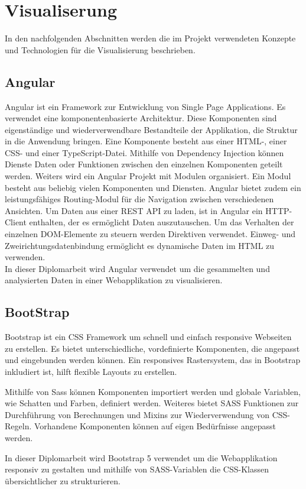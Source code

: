 \documentclass{report}
\begin{document}
\section{Visualiserung}
 In den nachfolgenden Abschnitten werden die im Projekt verwendeten Konzepte und Technologien  für die Visualisierung beschrieben.
\subsection{Angular}
Angular ist ein Framework zur Entwicklung von Single Page Applications. Es verwendet eine komponentenbasierte Architektur. Diese Komponenten sind eigenständige und wiederverwendbare Bestandteile  der Applikation, die Struktur in die Anwendung bringen. Eine Komponente besteht aus einer HTML-, einer CSS- und einer TypeScript-Datei. Mithilfe von Dependency Injection können Dienste Daten oder Funktionen  zwischen den einzelnen Komponenten geteilt werden. Weiters wird ein Angular Projekt mit Modulen organisiert. Ein Modul besteht aus beliebig vielen Komponenten und Diensten. Angular bietet zudem ein leistungsfähiges Routing-Modul für die Navigation zwischen verschiedenen Ansichten. Um Daten aus einer REST API zu laden, ist in Angular ein HTTP-Client enthalten, der es ermöglicht Daten auszutauschen. Um das Verhalten der einzelnen DOM-Elemente zu steuern werden Direktiven verwendet.
Einweg- und Zweirichtungsdatenbindung ermöglicht es dynamische Daten im HTML zu verwenden.
\\In dieser Diplomarbeit wird Angular verwendet um die gesammelten und analysierten Daten in einer Webapplikation zu visualisieren.

\subsection{BootStrap}
Bootstrap ist ein CSS Framework um schnell und einfach responsive Webseiten zu erstellen. Es bietet unterschiedliche, vordefinierte Komponenten, die angepasst und eingebunden werden können. Ein responsives Rastersystem, das in Bootstrap inkludiert ist, hilft flexible Layouts zu erstellen. 

Mithilfe von Sass können Komponenten importiert werden und globale Variablen, wie Schatten und Farben, definiert werden. Weiteres bietet SASS Funktionen zur Durchführung von Berechnungen und Mixins zur Wiederverwendung von CSS-Regeln. Vorhandene Komponenten können auf eigen Bedürfnisse angepasst werden.

In dieser Diplomarbeit wird Bootstrap 5 verwendet um die Webapplikation responsiv zu gestalten und mithilfe von SASS-Variablen die CSS-Klassen übersichtlicher zu strukturieren.
\end{document}
